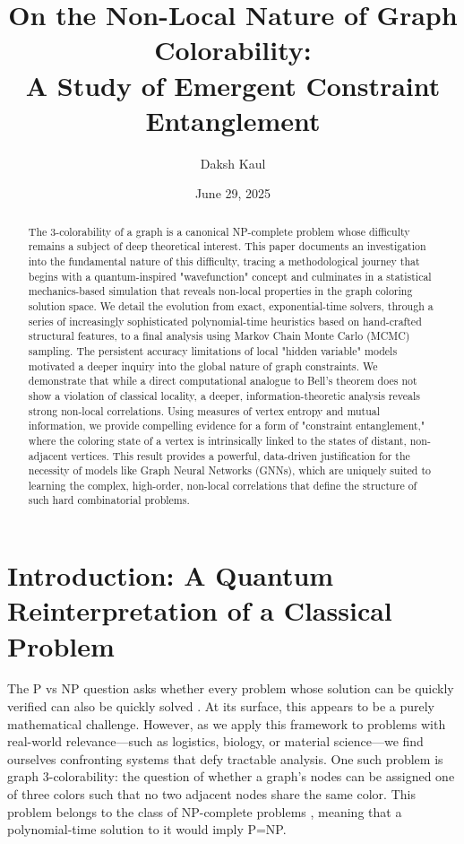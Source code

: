 \documentclass[12pt, letterpaper]{article}
\title{On the Non-Local Nature of Graph Colorability:\\A Study of Emergent Constraint Entanglement}
\author{Daksh Kaul}
\date{June 29, 2025}
\begin{document}
\maketitle

\begin{abstract}
The 3-colorability of a graph is a canonical NP-complete problem whose difficulty remains a subject of deep theoretical interest. This paper documents an investigation into the fundamental nature of this difficulty, tracing a methodological journey that begins with a quantum-inspired "wavefunction" concept and culminates in a statistical mechanics-based simulation that reveals non-local properties in the graph coloring solution space. We detail the evolution from exact, exponential-time solvers, through a series of increasingly sophisticated polynomial-time heuristics based on hand-crafted structural features, to a final analysis using Markov Chain Monte Carlo (MCMC) sampling. The persistent accuracy limitations of local "hidden variable" models motivated a deeper inquiry into the global nature of graph constraints. We demonstrate that while a direct computational analogue to Bell's theorem does not show a violation of classical locality, a deeper, information-theoretic analysis reveals strong non-local correlations. Using measures of vertex entropy and mutual information, we provide compelling evidence for a form of "constraint entanglement," where the coloring state of a vertex is intrinsically linked to the states of distant, non-adjacent vertices. This result provides a powerful, data-driven justification for the necessity of models like Graph Neural Networks (GNNs), which are uniquely suited to learning the complex, high-order, non-local correlations that define the structure of such hard combinatorial problems.
\end{abstract}

\section{Introduction: A Quantum Reinterpretation of a Classical Problem}

The P vs NP question asks whether every problem whose solution can be quickly verified can also be quickly solved \cite{cook1971complexity}. At its surface, this appears to be a purely mathematical challenge. However, as we apply this framework to problems with real-world relevance—such as logistics, biology, or material science—we find ourselves confronting systems that defy tractable analysis. One such problem is graph 3-colorability: the question of whether a graph's nodes can be assigned one of three colors such that no two adjacent nodes share the same color. This problem belongs to the class of NP-complete problems \cite{karp1972reducibility}, meaning that a polynomial-time solution to it would imply P=NP.
\end{document}
